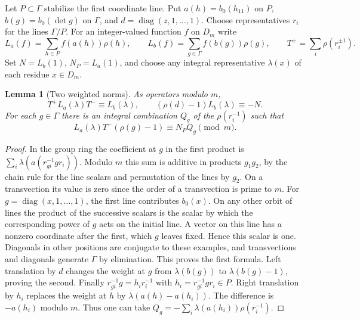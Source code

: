 \documentclass[a4paper,11pt]{article}
\newtheorem{lemma}[proposition]{Lemma}
\theoremstyle{definition}
\theoremstyle{remark}
\numberwithin{equation}{section}
\begin{document}
Let \(P\subset\Gamma\) stabilize the first coordinate line. Put
\(a(h)=b_0(h_{11})\) on \(P\), \(b(g)=b_0(\det g)\) on
\(\Gamma\), and \(d=\operatorname{diag}(z,1,\ldots,1)\).
Choose representatives \(r_i\) for the lines \(\Gamma/P\).
For an integer-valued function \(f\) on \(D_m\) write
\[
 L_a(f)=\sum_{h\in P}f(a(h))\rho(h),\qquad
 L_b(f)=\sum_{g\in\Gamma}f(b(g))\rho(g),\qquad
 T^\pm=\sum_i\rho(r_i^{\pm1}).
\]
Set \(N=L_b(1)\), \(N_P=L_a(1)\), and choose any integral
representative \(\lambda(x)\) of each residue \(x\in D_m\).

\begin{lemma}[Two weighted norms]\leavevmode\label{lem:transfer721}
As operators modulo \(m\),
\[
        T^+L_a(\lambda)T^-\equiv L_b(\lambda),
       \qquad(\rho(d)-1)L_b(\lambda)\equiv-N .
\]
For each \(g\in\Gamma\) there is an integral combination
\(Q_g\) of the \(\rho(r_i^{-1})\) such that
\[
       L_a(\lambda)T^-(\rho(g)-1)\equiv N_P Q_g\pmod m .
\]
\end{lemma}
\begin{proof}
In the group ring the coefficient at \(g\) in the first product
is \(\sum_i\lambda(a(r_{gi}^{-1}g r_i))\). Modulo \(m\) this
sum is additive in products \(g_1g_2\), by the chain rule for
the line scalars and permutation of the lines by \(g_2\).
On a transvection its value is zero since the order of a
transvection is prime to \(m\). For \(g=\operatorname{diag}
(x,1,\ldots,1)\), the first line contributes \(b_0(x)\).
On any other orbit of lines the product of the successive
scalars is the scalar by which the corresponding power of \(g\)
acts on the initial line. A vector on this line has a nonzero
coordinate after the first, which \(g\) leaves fixed. Hence this
scalar is one. Diagonals in other positions are conjugate to
these examples, and transvections and diagonals generate
\(\Gamma\) by elimination. This proves the first formula.
Left translation by \(d\) changes the weight at \(g\) from
\(\lambda(b(g))\) to \(\lambda(b(g)-1)\), proving the second.
Finally \(r_{gi}^{-1}g=h_i r_i^{-1}\) with
\(h_i=r_{gi}^{-1}g r_i\in P\).
Right translation by \(h_i\) replaces the weight at \(h\)
by \(\lambda(a(h)-a(h_i))\).
The difference is \(-a(h_i)\) modulo \(m\). Thus one can take
\(Q_g=-\sum_i\lambda(a(h_i))\rho(r_i^{-1})\).
\end{proof}
\end{document}
